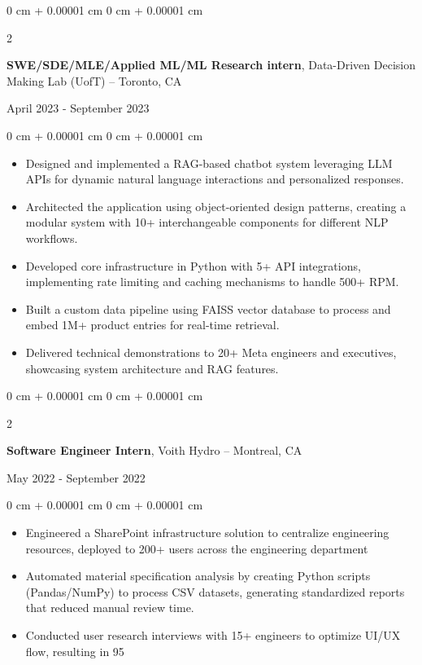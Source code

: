 \documentclass[11pt, letterpaper]{article}
\newenvironment{highlights}{
    \begin{itemize}[
        topsep=0.08 cm,
        parsep=0.08 cm,
        partopsep=0pt,
        itemsep=0pt,
        leftmargin=0.2 cm + 17pt
    ]
}
{
    \end{itemize}
}
\newenvironment{onecolentry}{
    \begin{adjustwidth}{
        0 cm + 0.00001 cm
    }{
        0 cm + 0.00001 cm
    }
}{
    \end{adjustwidth}
}
\newenvironment{twocolentry}[2][]{
    \onecolentry
    \def\secondColumn{#2}
    \setcolumnwidth{\fill, 4.5 cm}
    \begin{paracol}{2}
}{
    \switchcolumn \raggedleft \secondColumn
    \end{paracol}
    \endonecolentry
}
\begin{document}
\begin{twocolentry}{April 2023 - September 2023}
    {\textbf{SWE/SDE/MLE/Applied ML/ML Research intern}}, Data-Driven Decision Making Lab (UofT) -- Toronto, CA  
\end{twocolentry}  
\vspace{0.1cm}
\begin{onecolentry}
    \begin{highlights}
        \item Designed and implemented a RAG-based chatbot system leveraging LLM APIs for dynamic natural language interactions and personalized responses.
        \item Architected the application using object-oriented design patterns, creating a modular system with 10+ interchangeable components for different NLP workflows.
        \item Developed core infrastructure in Python with 5+ API integrations, implementing rate limiting and caching mechanisms to handle 500+ RPM.
        \item Built a custom data pipeline using FAISS vector database to process and embed 1M+ product entries for real-time retrieval.
        \item Delivered technical demonstrations to 20+ Meta engineers and executives, showcasing system architecture and RAG features.
    \end{highlights}
\end{onecolentry}

\begin{twocolentry}{May 2022 - September 2022}
    {\textbf{Software Engineer Intern}}, Voith Hydro -- Montreal, CA  
\end{twocolentry}  
\vspace{0.1cm}
\begin{onecolentry}
    \begin{highlights}
        \item Engineered a SharePoint infrastructure solution to centralize engineering resources, deployed to 200+ users across the engineering department
        \item Automated material specification analysis by creating Python scripts (Pandas/NumPy) to process CSV datasets, generating standardized reports that reduced manual review time.
        \item Conducted user research interviews with 15+ engineers to optimize UI/UX flow, resulting in 95%
    \end{highlights}
\end{onecolentry}
\end{document}

